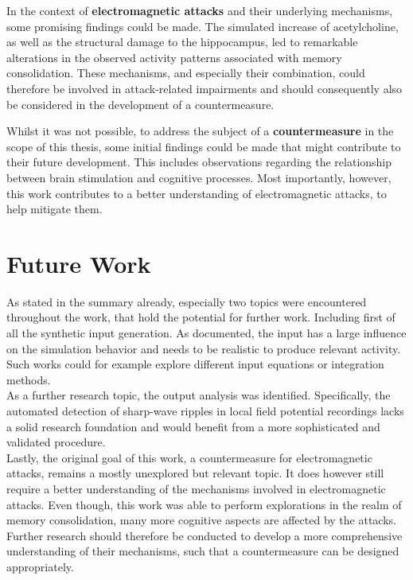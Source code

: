 In the context of \textbf{electromagnetic attacks} and their underlying mechanisms, some promising findings could be made. The simulated increase of acetylcholine, as well as the structural damage to the hippocampus, led to remarkable alterations in the observed activity patterns associated with memory consolidation. These mechanisms, and especially their combination, could therefore be involved in attack-related impairments and should consequently also be considered in the development of a countermeasure.

Whilst it was not possible, to address the subject of a \textbf{countermeasure} in the scope of this thesis, some initial findings could be made that might contribute to their future development. This includes observations regarding the relationship between brain stimulation and cognitive processes. Most importantly, however, this work contributes to a better understanding of electromagnetic attacks, to help mitigate them. 


\section{Future Work}
As stated in the summary already, especially two topics were encountered throughout the work, that hold the potential for further work.
Including first of all the synthetic input generation. As documented, the input has a large influence on the simulation behavior and needs to be realistic to produce relevant activity. Such works could for example explore different input equations or integration methods.\\
As a further research topic, the output analysis was identified. Specifically, the automated detection of sharp-wave ripples in local field potential recordings lacks a solid research foundation and would benefit from a more sophisticated and validated procedure.\\
Lastly, the original goal of this work, a countermeasure for electromagnetic attacks, remains a mostly unexplored but relevant topic. It does however still require a better understanding of the mechanisms involved in electromagnetic attacks. Even though, this work was able to perform explorations in the realm of memory consolidation, many more cognitive aspects are affected by the attacks. Further research should therefore be conducted to develop a more comprehensive understanding of their mechanisms, such that a countermeasure can be designed appropriately. 

    
   